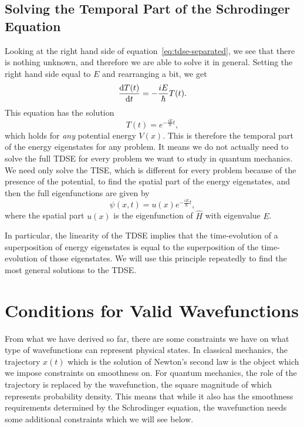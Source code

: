 \documentclass[../quantum_mechanics.tex]{subfiles}
\begin{document}
        \subsection{Solving the Temporal Part of the Schrodinger Equation}\label{subsec:solving-the-temporal-part-of-the-schrodinger-equation}
            Looking at the right hand side of equation~\ref{eq:tdse-separated}, we see that there is nothing unknown, and therefore we are able to solve it in general.
            Setting the right hand side equal to $E$ and rearranging a bit, we get
            \begin{equation}
                \dv{T(t)}{t}=-\frac{iE}{\hbar}T(t).
            \end{equation}
            This equation has the solution
            \begin{equation}
                T(t)=e^{-\frac{iE}{\hbar}t},
            \end{equation}
            which holds for \textit{any} potential energy $V(x)$.
            This is therefore the temporal part of the energy eigenstates for any problem.
            It means we do not actually need to solve the full TDSE for every problem we want to study in quantum mechanics. 
            We need only solve the TISE, which is different for every problem because of the presence of the potential, to find the spatial part of the energy eigenstates, and then the full eigenfunctions are given by
            \begin{equation}\label{eq:tdse-solution}
                \psi(x,t)=u(x)e^{-\frac{iE}{\hbar}t},
            \end{equation}
            where the spatial part $u(x)$ is the eigenfunction of $\hat{H}$ with eigenvalue $E$.

            In particular, the linearity of the TDSE implies that the time-evolution of a superposition of energy eigenstates is equal to the superposition of the time-evolution of those eigenstates.
            We will use this principle repeatedly to find the most general solutions to the TDSE.

    \section{Conditions for Valid Wavefunctions}\label{sec:conditions-for-valid-wavefunctions}
        From what we have derived so far, there are some constraints we have on what type of wavefunctions can represent physical states.
        In classical mechanics, the trajectory $x(t)$ which is the solution of Newton's second law is the object which we impose constraints on smoothness on.
        For quantum mechanics, the role of the trajectory is replaced by the wavefunction, the square magnitude of which represents probability density.
        This means that while it also has the smoothness requirements determined by the Schrodinger equation, the wavefunction needs some additional constraints which we will see below.
\end{document}
